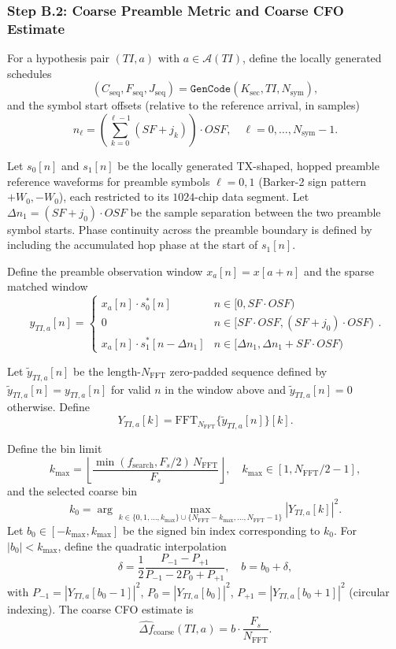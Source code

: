 \documentclass[11pt]{article}
\begin{document}
\subsubsection{Step B.2: Coarse Preamble Metric and Coarse CFO Estimate}

For a hypothesis pair $(\mathit{TI},a)$ with $a\in\mathcal{A}(\mathit{TI})$, define the locally generated schedules
\[
  (C_{\text{seq}}, F_{\text{seq}}, J_{\text{seq}})=\texttt{GenCode}(K_{\text{sec}}, \mathit{TI}, N_{\text{sym}}),
\]
and the symbol start offsets (relative to the reference arrival, in samples)
\[
  n_\ell = \left(\sum_{k=0}^{\ell-1} (\mathit{SF}+j_k)\right)\cdot \mathit{OSF},\quad \ell=0,\dots,N_{\text{sym}}-1.
\]

Let $s_0[n]$ and $s_1[n]$ be the locally generated TX-shaped, hopped preamble reference waveforms for preamble symbols $\ell=0,1$ (Barker-2 sign pattern $+W_0,-W_0$), each restricted to its $1024$-chip data segment. Let $\Delta n_1=(\mathit{SF}+j_0)\cdot \mathit{OSF}$ be the sample separation between the two preamble symbol starts. Phase continuity across the preamble boundary is defined by including the accumulated hop phase at the start of $s_1[n]$.

Define the preamble observation window $x_a[n]=x[a+n]$ and the sparse matched window
\[
  y_{\mathit{TI},a}[n]=
  \begin{cases}
  x_a[n]\cdot s_0^*[n] & n\in[0, \mathit{SF}\cdot\mathit{OSF}) \\
  0 & n\in[\mathit{SF}\cdot\mathit{OSF}, (\mathit{SF}+j_0)\cdot\mathit{OSF}) \\
  x_a[n]\cdot s_1^*[n-\Delta n_1] & n\in[\Delta n_1, \Delta n_1+\mathit{SF}\cdot\mathit{OSF})
  \end{cases}.
\]

Let $\widetilde y_{\mathit{TI},a}[n]$ be the length-$N_{\text{FFT}}$ zero-padded sequence defined by $\widetilde y_{\mathit{TI},a}[n]=y_{\mathit{TI},a}[n]$ for valid $n$ in the window above and $\widetilde y_{\mathit{TI},a}[n]=0$ otherwise. Define
\[
  Y_{\mathit{TI},a}[k]=\mathrm{FFT}_{N_{\text{FFT}}}\{\widetilde y_{\mathit{TI},a}[n]\}[k].
\]

Define the bin limit
\[
  k_{\max}=\left\lfloor \frac{\min(f_{\text{search}},F_s/2)\,N_{\text{FFT}}}{F_s}\right\rfloor,\quad k_{\max}\in[1,N_{\text{FFT}}/2-1],
\]
and the selected coarse bin
\[
  k_0=\arg\max_{k\in\{0,1,\dots,k_{\max}\}\cup\{N_{\text{FFT}}-k_{\max},\dots,N_{\text{FFT}}-1\}} |Y_{\mathit{TI},a}[k]|^2.
\]
Let $b_0\in[-k_{\max},k_{\max}]$ be the signed bin index corresponding to $k_0$. For $|b_0|<k_{\max}$, define the quadratic interpolation
\[
  \delta = \frac{1}{2}\frac{P_{-1}-P_{+1}}{P_{-1}-2P_0+P_{+1}},\quad b=b_0+\delta,
\]
with $P_{-1}=|Y_{\mathit{TI},a}[b_0-1]|^2$, $P_0=|Y_{\mathit{TI},a}[b_0]|^2$, $P_{+1}=|Y_{\mathit{TI},a}[b_0+1]|^2$ (circular indexing). The coarse CFO estimate is
\[
  \widehat{\Delta f}_{\text{coarse}}(\mathit{TI},a)=b\cdot \frac{F_s}{N_{\text{FFT}}}.
\]
\end{document}
